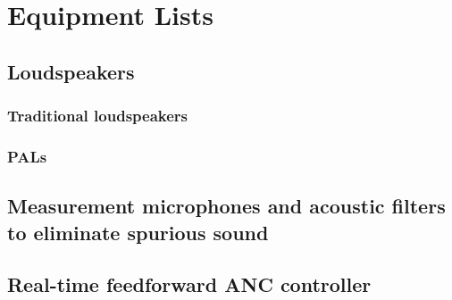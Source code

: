 
\chapter{Equipment Lists} %

\label{append:equip} %

\section{Loudspeakers}
\subsection{Traditional loudspeakers}

\subsection{PALs}

\section{Measurement microphones and acoustic filters to eliminate spurious sound}

\section{Real-time feedforward ANC controller}




